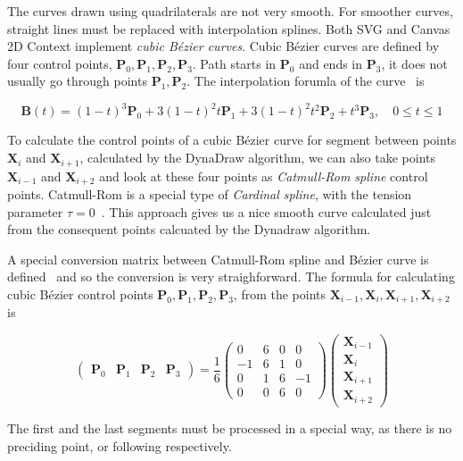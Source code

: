 The curves drawn using quadrilaterals are not very smooth. For smoother curves, straight lines must be replaced with interpolation splines. Both SVG and Canvas 2D Context implement \textit{cubic Bézier curves}. Cubic Bézier curves are defined by four control points, $ \mathbf{P}_0, \mathbf{P}_1, \mathbf{P}_2, \mathbf{P}_3 $. Path starts in $ \mathbf{P}_0 $ and ends in $ \mathbf{P}_3 $, it does not usually go through points $ \mathbf{P}_1, \mathbf{P}_2 $. The interpolation forumla of the curve~\cite{bezier} is

$$ \mathbf{B}(t) = (1 - t)^3 \mathbf{P}_0 + 3(1-t)^{2}t\mathbf{P}_1 + 3(1-t)^{2}t^2\mathbf{P}_2 + t^3\mathbf{P}_3,\quad 0 \leq t \leq 1$$ 

To calculate the control points of a cubic Bézier curve for segment between points $\mathbf{X}_i$ and $\mathbf{X}_{i+1}$, calculated by the DynaDraw algorithm, we can also take points $\mathbf{X}_{i-1}$ and $\mathbf{X}_{i+2}$ and look at these four points as \textit{Catmull-Rom spline} control points. Catmull-Rom is a special type of \textit{Cardinal spline}, with the tension parameter $\tau = 0$~\cite{catmull_rom}. This approach gives us a nice smooth curve calculated just from the consequent points calcuated by the Dynadraw algorithm.

A special conversion matrix between Catmull-Rom spline and Bézier curve is defined~\cite{catmull_bezier} and so the conversion is very straighforward. The formula for calculating cubic Bézier control points $ \mathbf{P}_0, \mathbf{P}_1, \mathbf{P}_2, \mathbf{P}_3 $, from the points $ \mathbf{X}_{i-1}, \mathbf{X}_i, \mathbf{X}_{i+1}, \mathbf{X}_{i+2} $ is

$$
\begin{pmatrix}\mathbf{P}_0 & \mathbf{P}_1 & \mathbf{P}_{2} & \mathbf{P}_{3} \end{pmatrix} = \frac{1}{6}\begin{pmatrix} 0 & 6 & 0 & 0 \\ -1 & 6 & 1 & 0 \\ 0 & 1 & 6 & -1 \\ 0 & 0 & 6 & 0 \end{pmatrix} \begin{pmatrix} \mathbf{X}_{i-1} \\ \mathbf{X}_i \\ \mathbf{X}_{i+1} \\ \mathbf{X}_{i+2} \end{pmatrix}
$$

The first and the last segments must be processed in a special way, as there is no preciding point, or following respectively. 

